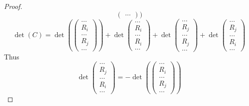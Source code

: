 \documentclass{article}
\newtheorem{one minute paper}[theorem]{One Minute Paper}
\begin{document}
\begin{proof}
\begin{equation}
\begin{pmatrix}
            \dots
        \end{pmatrix})
    \end{equation}
    \begin{equation}
        \det(C) = \det(\begin{pmatrix}
            \dots \\
            R_i\\
            \dots \\
            R_j\\
            \dots
        \end{pmatrix})  + \det\begin{pmatrix}
            \dots \\
            R_i\\
            \dots \\
            R_i\\
            \dots
        \end{pmatrix} + \det\begin{pmatrix}
            \dots \\
            R_j\\
            \dots \\
            R_j\\
            \dots
        \end{pmatrix} + \det\begin{pmatrix}
            \dots \\
            R_j\\
            \dots \\
            R_i\\
            \dots
        \end{pmatrix}
    \end{equation}
    Thus 
    \begin{equation}
        \det\begin{pmatrix}
            \dots \\
            R_j\\
            \dots \\
            R_i\\
            \dots
        \end{pmatrix} = -\det(\begin{pmatrix}
            \dots \\
            R_i\\
            \dots \\
            R_j\\
            \dots
        \end{pmatrix})  
    \end{equation}
\end{proof}
\end{document}
